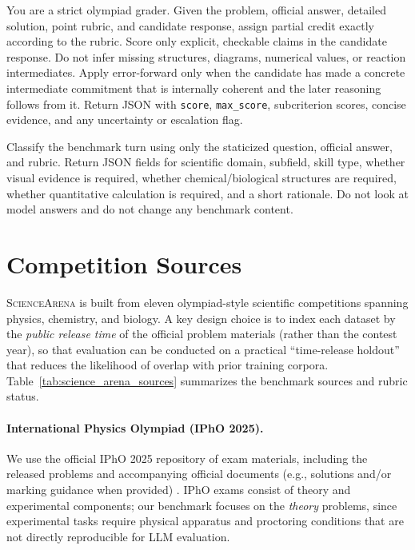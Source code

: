 \documentclass[11pt]{article}
\begin{document}
\begin{tcolorbox}[
  title={Rubric-faithful judge prompt},
  colback=gray!3,
  colframe=black!35,
  boxrule=0.6pt,
  arc=1.5mm,
  left=1.5mm,right=1.5mm,top=1mm,bottom=1mm
]
\footnotesize
You are a strict olympiad grader.
Given the problem, official answer, detailed solution, point rubric, and candidate response, assign partial credit exactly according to the rubric.
Score only explicit, checkable claims in the candidate response.
Do not infer missing structures, diagrams, numerical values, or reaction intermediates.
Apply error-forward only when the candidate has made a concrete intermediate commitment that is internally coherent and the later reasoning follows from it.
Return JSON with \texttt{score}, \texttt{max\_score}, subcriterion scores, concise evidence, and any uncertainty or escalation flag.
\end{tcolorbox}

\begin{tcolorbox}[
  title={Subfield and modality classification prompt},
  colback=gray!3,
  colframe=black!35,
  boxrule=0.6pt,
  arc=1.5mm,
  left=1.5mm,right=1.5mm,top=1mm,bottom=1mm
]
\footnotesize
Classify the benchmark turn using only the staticized question, official answer, and rubric.
Return JSON fields for scientific domain, subfield, skill type, whether visual evidence is required, whether chemical/biological structures are required, whether quantitative calculation is required, and a short rationale.
Do not look at model answers and do not change any benchmark content.
\end{tcolorbox}

\section{Competition Sources}
\label{app:competitions}

\textsc{ScienceArena} is built from eleven olympiad-style scientific competitions spanning physics, chemistry, and biology. A key design choice is to index each dataset by the \emph{public release time} of the official problem materials (rather than the contest year), so that evaluation can be conducted on a practical ``time-release holdout'' that reduces the likelihood of overlap with prior training corpora. Table~\ref{tab:science_arena_sources} summarizes the benchmark sources and rubric status.

\paragraph{International Physics Olympiad (IPhO 2025).}
We use the official IPhO 2025 repository of exam materials, including the released problems and accompanying official documents (e.g., solutions and/or marking guidance when provided) \citep{ipho2025_official_questions}. IPhO exams consist of theory and experimental components; our benchmark focuses on the \emph{theory} problems, since experimental tasks require physical apparatus and proctoring conditions that are not directly reproducible for LLM evaluation.
\end{document}

